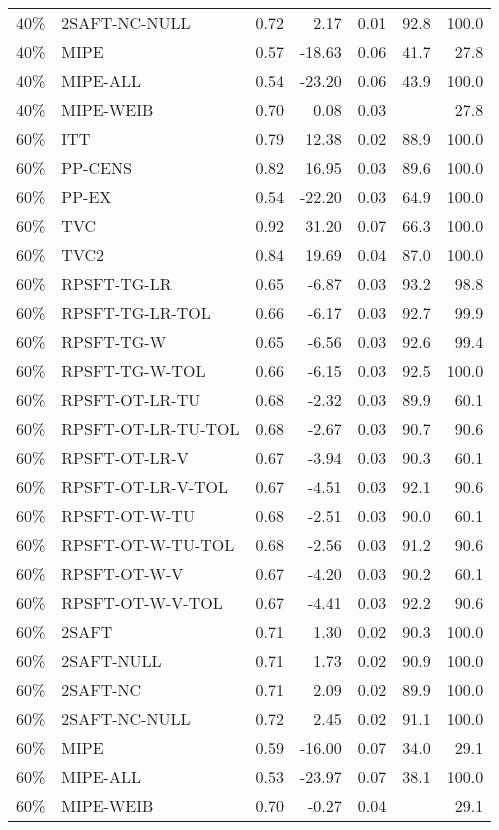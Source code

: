 \begin{table}[ht]
{\begin{tabular}{llrrrrr}
  40\% & 2SAFT-NC-NULL & 0.72 & 2.17 & 0.01 & 92.8 & 100.0 \\ 
  40\% & MIPE & 0.57 & -18.63 & 0.06 & 41.7 & 27.8 \\ 
  40\% & MIPE-ALL & 0.54 & -23.20 & 0.06 & 43.9 & 100.0 \\ 
  40\% & MIPE-WEIB & 0.70 & 0.08 & 0.03 &  & 27.8 \\ 
   \hline
60\% & ITT & 0.79 & 12.38 & 0.02 & 88.9 & 100.0 \\ 
  60\% & PP-CENS & 0.82 & 16.95 & 0.03 & 89.6 & 100.0 \\ 
  60\% & PP-EX & 0.54 & -22.20 & 0.03 & 64.9 & 100.0 \\ 
  60\% & TVC & 0.92 & 31.20 & 0.07 & 66.3 & 100.0 \\ 
  60\% & TVC2 & 0.84 & 19.69 & 0.04 & 87.0 & 100.0 \\ 
   \hline
60\% & RPSFT-TG-LR & 0.65 & -6.87 & 0.03 & 93.2 & 98.8 \\ 
  60\% & RPSFT-TG-LR-TOL & 0.66 & -6.17 & 0.03 & 92.7 & 99.9 \\ 
  60\% & RPSFT-TG-W & 0.65 & -6.56 & 0.03 & 92.6 & 99.4 \\ 
  60\% & RPSFT-TG-W-TOL & 0.66 & -6.15 & 0.03 & 92.5 & 100.0 \\ 
  60\% & RPSFT-OT-LR-TU & 0.68 & -2.32 & 0.03 & 89.9 & 60.1 \\ 
  60\% & RPSFT-OT-LR-TU-TOL & 0.68 & -2.67 & 0.03 & 90.7 & 90.6 \\ 
  60\% & RPSFT-OT-LR-V & 0.67 & -3.94 & 0.03 & 90.3 & 60.1 \\ 
  60\% & RPSFT-OT-LR-V-TOL & 0.67 & -4.51 & 0.03 & 92.1 & 90.6 \\ 
   \hline
60\% & RPSFT-OT-W-TU & 0.68 & -2.51 & 0.03 & 90.0 & 60.1 \\ 
  60\% & RPSFT-OT-W-TU-TOL & 0.68 & -2.56 & 0.03 & 91.2 & 90.6 \\ 
  60\% & RPSFT-OT-W-V & 0.67 & -4.20 & 0.03 & 90.2 & 60.1 \\ 
  60\% & RPSFT-OT-W-V-TOL & 0.67 & -4.41 & 0.03 & 92.2 & 90.6 \\ 
   \hline
60\% & 2SAFT & 0.71 & 1.30 & 0.02 & 90.3 & 100.0 \\ 
  60\% & 2SAFT-NULL & 0.71 & 1.73 & 0.02 & 90.9 & 100.0 \\ 
  60\% & 2SAFT-NC & 0.71 & 2.09 & 0.02 & 89.9 & 100.0 \\ 
  60\% & 2SAFT-NC-NULL & 0.72 & 2.45 & 0.02 & 91.1 & 100.0 \\ 
  60\% & MIPE & 0.59 & -16.00 & 0.07 & 34.0 & 29.1 \\ 
  60\% & MIPE-ALL & 0.53 & -23.97 & 0.07 & 38.1 & 100.0 \\ 
  60\% & MIPE-WEIB & 0.70 & -0.27 & 0.04 &  & 29.1 \\ 
   \hline
\end{tabular}
}
\end{table}
